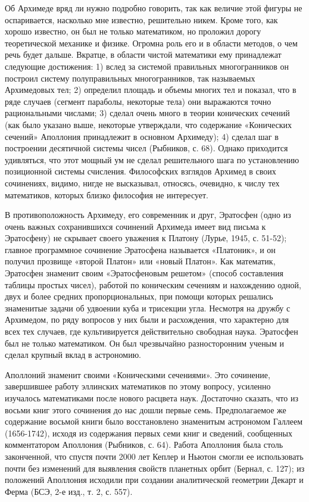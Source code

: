 Об Архимеде вряд ли нужно подробно говорить, так как величие этой
фигуры не оспаривается, насколько мне известно, решительно никем.
Кроме того, как хорошо известно, он был не только математиком, но
проложил дорогу теоретической механике и физике. Огромна роль его и в
области методов, о чем речь будет дальше. Вкратце, в области чистой
математики ему принадлежат следующие достижения: 1) вслед за системой
правильных многогранников он построил систему полуправильных
многогранников, так называемых Архимедовых тел; 2) определил площадь и
объемы многих тел и показал, что в ряде случаев (сегмент параболы,
некоторые тела) они выражаются точно рациональными числами; 3) сделал
очень много в теории конических сечений (как было указано выше,
некоторые утверждали, что содержание «Конических сечений» Аполлония
принадлежит в основном Архимеду); 4) сделал шаг в построении
десятичной системы чисел (Рыбников, с. 68). Однако приходится
удивляться, что этот мощный ум не сделал решительного шага по
установлению позиционной системы счисления. Философских взглядов
Архимед в своих сочинениях, видимо, нигде не высказывал, относясь,
очевидно, к числу тех математиков, которых близко философия не
интересует.

В противоположность Архимеду, его современник и друг, Эратосфен (одно
из очень важных сохранившихся сочинений Архимеда имеет вид письма к
Эратосфену) не скрывает своего уважения к Платону (Лурье, 1945, с.
51-52); главное программное сочинение Эратосфена называется
«Платоник», и он получил прозвище «второй Платон» или «новый Платон».
Как математик, Эратосфен знаменит своим «Эратосфеновым решетом»
(способ составления таблицы простых чисел), работой по коническим
сечениям и нахождению одной, двух и более средних пропорциональных,
при помощи которых решались знаменитые задачи об удвоении куба и
трисекции угла. Несмотря на дружбу с Архимедом, по ряду вопросов у них
были и расхождения, что характерно для всех тех случаев, где
культивируется действительно свободная наука. Эратосфен был не только
математиком. Он был чрезвычайно разносторонним ученым и сделал крупный
вклад в астрономию.

Аполлоний знаменит своими «Коническими сечениями». Это сочинение,
завершившее работу эллинских математиков по этому вопросу, усиленно
изучалось математиками после нового расцвета наук. Достаточно сказать,
что из восьми книг этого сочинения до нас дошли первые семь.
Предполагаемое же содержание восьмой книги было восстановлено
знаменитым астрономом Галлеем (1656-1742), исходя из содержания первых
семи книг и сведений, сообщенных комментатором Аполлония (Рыбников, с.
64). Работа Аполлония была столь законченной, что спустя почти 2000
лет Кеплер и Ньютон смогли ее использовать почти без изменений для
выявления свойств планетных орбит (Бернал, с. 127); из положений
Аполлония исходили при создании аналитической геометрии Декарт и Ферма
(БСЭ, 2-е изд., т. 2, с. 557).

